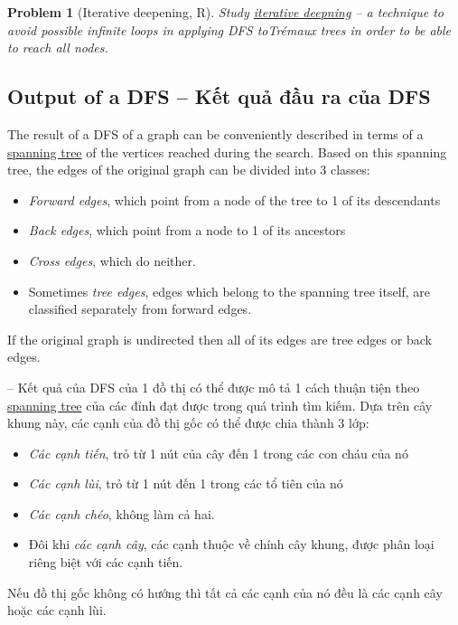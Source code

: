 \documentclass[oneside]{book}
\newtheorem{problem}{Problem}
\begin{document}
\begin{problem}[Iterative deepening, R]
	Study \href{https://en.wikipedia.org/wiki/Iterative_deepening_depth-first_search}{iterative deepning} -- a technique to avoid possible infinite loops in applying DFS toTr\'emaux trees in order to be able to reach all nodes. 
\end{problem}


\subsection{Output of a DFS -- Kết quả đầu ra của DFS}
The result of a DFS of a graph can be conveniently described in terms of a \href{https://en.wikipedia.org/wiki/Spanning_tree_(mathematics)}{spanning tree} of the vertices reached during the search. Based on this spanning tree, the edges of the original graph can be divided into 3 classes:
\begin{itemize}
	\item {\it Forward edges}, which point from a node of the tree to 1 of its descendants
	\item {\it Back edges}, which point from a node to 1 of its ancestors
	\item {\it Cross edges}, which do neither.
	\item Sometimes {\it tree edges}, edges which belong to the spanning tree itself, are classified separately from forward edges.
\end{itemize}
If the original graph is undirected then all of its edges are tree edges or back edges.

-- Kết quả của DFS của 1 đồ thị có thể được mô tả 1 cách thuận tiện theo \href{https://en.wikipedia.org/wiki/Spanning_tree_(mathematics)}{spanning tree} của các đỉnh đạt được trong quá trình tìm kiếm. Dựa trên cây khung này, các cạnh của đồ thị gốc có thể được chia thành 3 lớp:
\begin{itemize}
	\item {\it Các cạnh tiến}, trỏ từ 1 nút của cây đến 1 trong các con cháu của nó
	\item {\it Các cạnh lùi}, trỏ từ 1 nút đến 1 trong các tổ tiên của nó
	\item {\it Các cạnh chéo}, không làm cả hai.
	\item Đôi khi {\it các cạnh cây}, các cạnh thuộc về chính cây khung, được phân loại riêng biệt với các cạnh tiến.
\end{itemize}
Nếu đồ thị gốc không có hướng thì tất cả các cạnh của nó đều là các cạnh cây hoặc các cạnh lùi.
\end{document}
